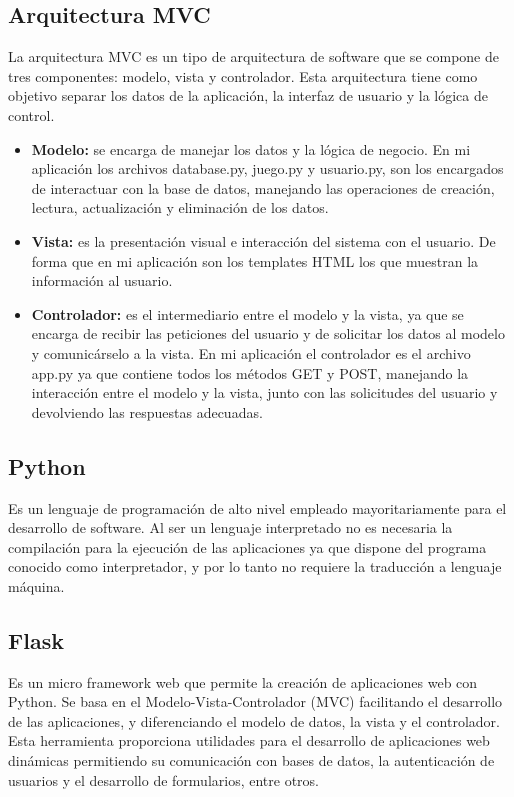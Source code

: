 \subsection{Arquitectura MVC}
\cite{MVC} La arquitectura MVC es un tipo de arquitectura de software que se compone de tres componentes: modelo, vista y controlador. Esta arquitectura tiene como objetivo separar los datos de la aplicación, la interfaz de usuario y la lógica de control.
\begin{itemize}
    \item \textbf{Modelo:} se encarga de manejar los datos y la lógica de negocio. En mi aplicación los archivos database.py, juego.py y usuario.py, son los encargados de interactuar con la base de datos, manejando las operaciones de creación, lectura, actualización y eliminación de los datos.
    \item \textbf{Vista:} es la presentación visual e interacción del sistema con el usuario. De forma que en mi aplicación son los templates HTML los que muestran la información al usuario. 
    \item \textbf{Controlador:} es el intermediario entre el modelo y la vista, ya que se encarga de recibir las peticiones del usuario y de solicitar los datos al modelo y comunicárselo a la vista. En mi aplicación el controlador es el archivo app.py ya que contiene todos los métodos GET y POST, manejando la interacción entre el modelo y la vista, junto con las solicitudes del usuario y devolviendo las respuestas adecuadas.
\end{itemize}

\subsection{Python}
\cite{Python1_bib} Es un lenguaje de programación de alto nivel empleado mayoritariamente para el desarrollo de software. \cite{Python2_bib} Al ser un lenguaje interpretado no es necesaria la compilación para la ejecución de las aplicaciones ya que dispone del programa conocido como interpretador, y por lo tanto no requiere la traducción a lenguaje máquina.

\subsection{Flask}
\cite{Flask_bib} Es un micro framework web que permite la creación de aplicaciones web con Python. Se basa en el Modelo-Vista-Controlador (MVC) facilitando el desarrollo de las aplicaciones, y diferenciando el modelo de datos, la vista y el controlador.
Esta herramienta proporciona utilidades para el desarrollo de aplicaciones web dinámicas permitiendo su comunicación con bases de datos, la autenticación de usuarios y el desarrollo de formularios, entre otros.

